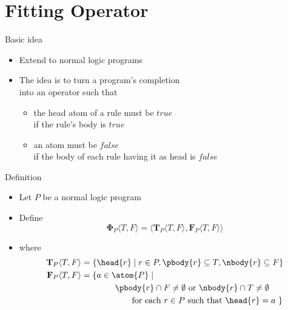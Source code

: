 \section{Fitting Operator}
\begin{frame}{Basic idea}
  \bigskip
  \begin{itemize}
  \item {} Extend  to normal logic programs
    \medskip
  \item {}
    The idea is to turn a program's completion\\ into an operator such that
    \smallskip
    \begin{itemize}
    \item the head atom of a rule must be $\mathit{true}$\\
      if the rule's body is $\mathit{true}$
    \item an atom must be $\mathit{false}$\\
      if the body of each rule having it as head is $\mathit{false}$
    \end{itemize}
  \end{itemize}
\end{frame}
\begin{frame}{Definition}
  \bigskip
  \begin{itemize}
  \item<1-> Let $P$ be a normal logic program
  \item<2-> Define
    \[
    {\mathbf{\Phi}}_P\langle T,F \rangle
    =
    \langle
    {\mathbf{T}}_P\langle T,F \rangle,
    {\mathbf{F}}_P\langle T,F \rangle
    \rangle
    \]
  \item<2-> []
    where
    \begin{align*}
      {\mathbf{T}}_P\langle T,F \rangle
      & =
      \{  \head{r} \mid r \in P, \pbody{r} \subseteq T, \nbody{r} \subseteq F  \}
      \\
      {\mathbf{F}}_P\langle T,F \rangle
      & =
      \{  a \in \atom{P} \mid
      \\ &  \qquad\qquad
      \pbody{r} \cap F \neq \emptyset
      \text{ or }
      \nbody{r} \cap T \neq \emptyset
      \\ &  \qquad\qquad\qquad
      \text{for each } r \in P
      \text{ such that }
      \head{r} = a
      \ \}
    \end{align*}
  \end{itemize}
\end{frame}
